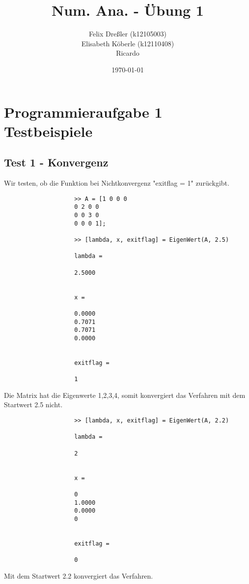 \documentclass[11pt,titlepage]{article}
\title{Num. Ana. - Übung 1}
\author{Felix Dreßler (k12105003) \\ Elisabeth Köberle (k12110408) \\ Ricardo}
\date{\today} %
\begin{document}
\maketitle

	\section{Programmieraufgabe 1 Testbeispiele}
		\subsection{Test 1 - Konvergenz}
			Wir testen, ob die Funktion bei Nichtkonvergenz "exitflag = 1" zurückgibt.
			
			\begin{lstlisting}
					>> A = [1 0 0 0
					0 2 0 0
					0 0 3 0
					0 0 0 1];
					
					>> [lambda, x, exitflag] = EigenWert(A, 2.5)
					
					lambda =
					
					2.5000
					
					
					x =
					
					0.0000
					0.7071
					0.7071
					0.0000
					
					
					exitflag =
					
					1
			\end{lstlisting}
			Die Matrix hat die Eigenwerte 1,2,3,4, somit konvergiert das Verfahren mit dem Startwert 2.5 nicht. 
			\begin{lstlisting}
					>> [lambda, x, exitflag] = EigenWert(A, 2.2)
					
					lambda =
					
					2
					
					
					x =
					
					0
					1.0000
					0.0000
					0
					
					
					exitflag =
					
					0
			\end{lstlisting}
			Mit dem Startwert 2.2 konvergiert das Verfahren.
		
			
\end{document}
